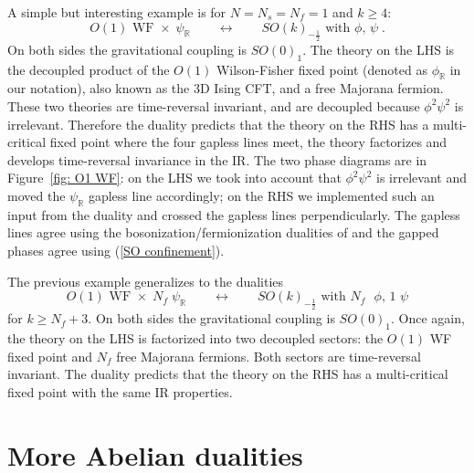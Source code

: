 \documentclass[a4paper, 12pt]{article}
\numberwithin{equation}{section}
\newcommand{\be}{\begin{equation}} \newcommand{\ee}{\end{equation}}
\newcommand{\bR}{\mathbb{R}}
\begin{document}
A simple but interesting example is for $N=N_s = N_f = 1$ and $k\geq 4$:
\be
O(1) \text{ WF } \times\; \psi_\bR \qquad\longleftrightarrow\qquad SO(k)_{-\frac12} \text{ with $\phi$, $\psi$} \;.
\ee
On both sides the gravitational coupling is $SO(0)_1$. The theory on the LHS is the decoupled product of the $O(1)$ Wilson-Fisher fixed point (denoted as $\phi_\bR$ in our notation), also known as the 3D Ising CFT, and a free Majorana fermion. These two theories are time-reversal invariant, and are decoupled because $\phi^2 \psi^2$ is irrelevant. Therefore the duality predicts that the theory on the RHS has a multi-critical fixed point where the four gapless lines meet, the theory factorizes and develops time-reversal invariance in the IR. The two phase diagrams are in Figure~\ref{fig: O1 WF}: on the LHS we took into account that $\phi^2\psi^2$ is irrelevant and moved the $\psi_\bR$ gapless line accordingly; on the RHS we implemented such an input from the duality and crossed the gapless lines perpendicularly. The gapless lines agree using the bosonization/fermionization dualities of \cite{Aharony:2016jvv} and the gapped phases agree using (\ref{SO confinement}).

The previous example generalizes to the dualities
\be
O(1) \text{ WF } \times\; N_f\; \psi_\bR \qquad\longleftrightarrow\qquad SO(k)_{-\frac12} \text{ with $N_f$ $\phi$, 1 $\psi$}
\ee
for $k \geq N_f+3$. On both sides the gravitational coupling is $SO(0)_1$. Once again, the theory on the LHS is factorized into two decoupled sectors: the $O(1)$ WF fixed point and $N_f$ free Majorana fermions. Both sectors are time-reversal invariant. The duality predicts that the theory on the RHS has a multi-critical fixed point with the same IR properties.
























\section{More Abelian dualities}
\label{sec: Abelian dualities}
\end{document}
